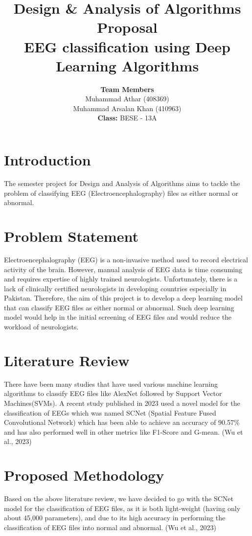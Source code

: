 \documentclass[11pt]{article}
\title{\textbf{Design \& Analysis of Algorithms Proposal \\ \vspace{5mm} EEG classification using Deep Learning Algorithms}}
\author{\textbf{Team Members} \vspace{1mm} \\ Muhammad Athar (408369) \\ Muhammad Arsalan Khan (410963) \vspace{5mm} \\ \textbf{Class: }BESE - 13A}
\begin{document}
\maketitle

\justifying
\section{Introduction}
The semester project for Design and Analysis of Algorithms aims to tackle the problem of classifying EEG (Electroencephalography) files as either normal or abnormal.

\section{Problem Statement}
Electroencephalography (EEG) is a non-invasive method used to record electrical activity of the brain. However, manual analysis of EEG data is time consuming and requires expertise of highly trained neurologists. Unfortunately, there is a lack of clinically certified neurologists in developing countries especially in Pakistan. Therefore, the aim of this project is to develop a deep learning model that can classify EEG files as either normal or abnormal. Such deep learning model would help in the initial screening of EEG files and would reduce the workload of neurologists.

\section{Literature Review}
There have been many studies that have used various machine learning algorithms to classify EEG files like AlexNet followed by Support Vector Machines(SVMs). A recent study published in 2023 used a novel model for the classification of EEGs which was named SCNet (Spatial Feature Fused Convolutional Network) which has been able to achieve an accuracy of 90.57\% and has also performed well in other metrics like F1-Score and G-mean. (Wu et al., 2023)

\section{Proposed Methodology}
Based on the above literature review, we have decided to go with the SCNet model for the classification of EEG files, as it is both light-weight (having only about 45,000 parameters), and due to its high accuracy in performing the classification of EEG files into normal and abnormal. (Wu et al., 2023)
\end{document}
